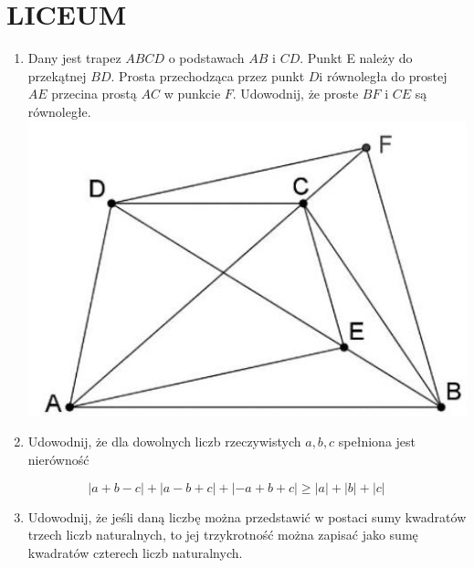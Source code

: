 \documentclass[10pt]{article}
\begin{document}
\section*{LICEUM}
\begin{enumerate}
  \item Dany jest trapez \(A B C D\) o podstawach \(A B\) i \(C D\). Punkt E należy do przekątnej \(B D\). Prosta przechodząca przez punkt \(D \mathrm{i}\) równoległa do prostej \(A E\) przecina prostą \(A C\) w punkcie \(F\). Udowodnij, że proste \(B F\) i \(C E\) są równoległe.\\
\includegraphics[max width=\textwidth, center]{2024_11_21_8d7e1e416accc1d3f745g-1}
  \item Udowodnij, że dla dowolnych liczb rzeczywistych \(a, b, c\) spełniona jest nierówność
\end{enumerate}

\[
|a+b-c|+|a-b+c|+|-a+b+c| \geq|a|+|b|+|c|
\]

\begin{enumerate}
  \setcounter{enumi}{2}
  \item Udowodnij, że jeśli daną liczbę można przedstawić w postaci sumy kwadratów trzech liczb naturalnych, to jej trzykrotność można zapisać jako sumę kwadratów czterech liczb naturalnych.
\end{enumerate}
\end{document}
